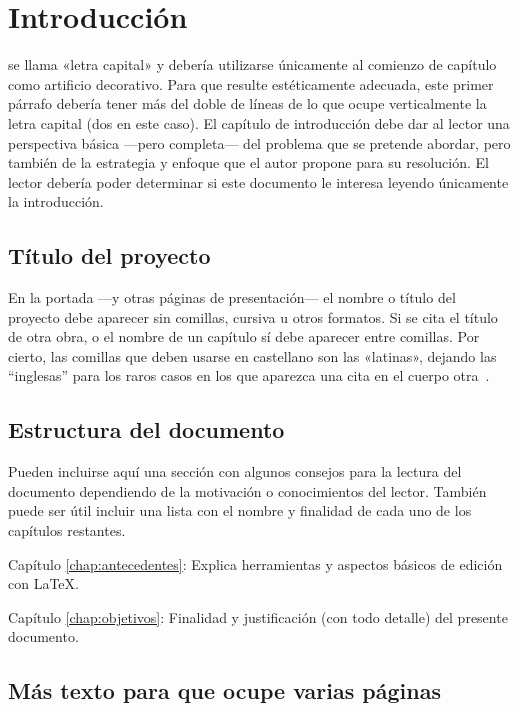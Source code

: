 \chapter{Introducción}

 se llama «letra capital» y debería utilizarse únicamente al
comienzo de capítulo como artificio decorativo. Para que resulte estéticamente
adecuada, este primer párrafo debería tener más del doble de líneas de lo que
ocupe verticalmente la letra capital (dos en este caso). El capítulo de
introducción debe dar al lector una perspectiva básica ---pero completa--- del
problema que se pretende abordar, pero también de la estrategia y enfoque que el
autor propone para su resolución. El lector debería poder determinar si este
documento le interesa leyendo únicamente la introducción.


\section{Título del proyecto}

En la portada ---y otras páginas de presentación--- el nombre o título del
proyecto debe aparecer sin comillas, cursiva u otros formatos. Si se cita el
título de otra obra, o el nombre de un capítulo sí debe aparecer entre
comillas. Por cierto, las comillas que deben usarse en castellano son las
«latinas», dejando las ``inglesas'' para los raros casos en los que aparezca una
cita en el cuerpo otra~\cite{sousa}.


\section{Estructura del documento}

Pueden incluirse aquí una sección con algunos consejos para la lectura del
documento dependiendo de la motivación o conocimientos del lector.  También
puede ser útil incluir una lista con el nombre y finalidad de cada uno de los
capítulos restantes.


\begin{definitionlist}
\item[Capítulo \ref{chap:antecedentes}: \nameref{chap:antecedentes}] Explica herramientas
  y aspectos básicos de edición con \LaTeX.
\item[Capítulo \ref{chap:objetivos}: \nameref{chap:objetivos}] Finalidad y justificación
  (con todo detalle) del presente documento.
\end{definitionlist}


\section{Más texto para que ocupe varias páginas}


